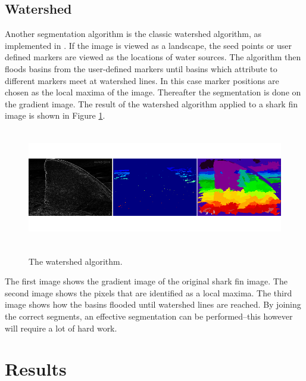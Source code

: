 \documentclass[a4paper,10pt]{article}
\begin{document}
\subsection{Watershed}
\label{watershed}
Another segmentation algorithm is the classic watershed algorithm, as
implemented in \cite{scikit}.  If the image is viewed
  as a landscape, the seed points or user defined markers are viewed as the locations of water sources.  The algorithm then floods
basins from the user-defined markers until basins which attribute to different
markers meet at watershed lines.  In this case marker positions are chosen as
the local maxima of the image.  Thereafter the segmentation is done on the
gradient image.  The result of the watershed algorithm applied to a shark fin
image is shown in Figure \ref{fig1}.

\begin{figure}[H]
\centering
\includegraphics[width=5in,height=2in]{watershed.png} 
\label{fig1}
\caption{The watershed algorithm. \cite{scikit}}
\end{figure}

\noindent The first image shows the gradient image of the original shark fin
image.  The second image shows the pixels that are identified as a local maxima.
 The third image shows how the basins flooded until watershed lines are reached.
 By joining the correct segments, an effective segmentation can be performed--this however will require
 a lot of hard work.

\newpage
\section{Results}
\subsection{}


\subsection{}
\end{document}
